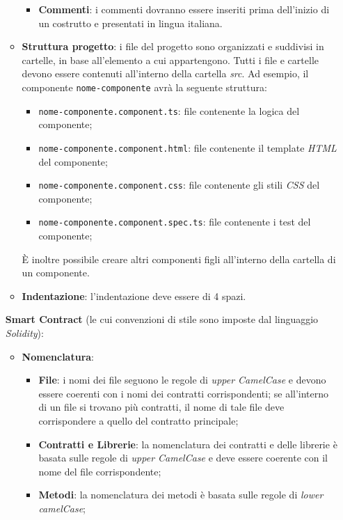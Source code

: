 \begin{itemize}
\begin{itemize}
\begin{itemize}
            \item \textbf{Commenti}: i commenti dovranno essere inseriti prima dell’inizio di un  costrutto e presentati in
            lingua italiana.
        \end{itemize}
        \item \textbf{Struttura progetto}: i file del progetto sono organizzati e suddivisi in cartelle, in base all'elemento a cui appartengono.
        Tutti i file e cartelle devono essere contenuti all'interno della cartella \textit{src}.
        Ad esempio, il componente \texttt{nome-componente} avrà la seguente struttura:
        \begin{itemize}
            \item \texttt{nome-componente.component.ts}: file contenente la logica del componente;
            \item \texttt{nome-componente.component.html}: file contenente il template \textit{HTML} del componente;
            \item \texttt{nome-componente.component.css}: file contenente gli stili \textit{CSS} del componente;
            \item \texttt{nome-componente.component.spec.ts}: file contenente i test del componente;
        \end{itemize}
        È inoltre possibile creare altri componenti figli all'interno della cartella di un componente.
        \item \textbf{Indentazione}: l'indentazione deve essere di 4 spazi.
    \end{itemize}
    \textbf{Smart Contract} (le cui convenzioni di stile sono imposte dal linguaggio \textit{Solidity}):
    \begin{itemize}
        \item \textbf{Nomenclatura}:
        \begin{itemize}
            \item \textbf{File}: i nomi dei file seguono le regole di \textit{upper CamelCase} e devono essere coerenti con i nomi dei contratti corrispondenti; se all'interno di un file si trovano più contratti, il nome di tale file deve corrispondere a quello del contratto principale;
            \item \textbf{Contratti e Librerie}: la nomenclatura dei contratti e delle librerie è basata sulle regole di \textit{upper CamelCase} e deve essere coerente con il nome del file corrispondente;
            \item \textbf{Metodi}: la nomenclatura dei metodi è basata sulle regole di \textit{lower camelCase};

\end{itemize}
\end{itemize}
\end{itemize}
